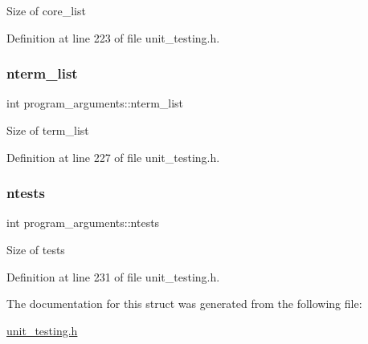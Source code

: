 Size of {\ttfamily core\+\_\+list} 

Definition at line 223 of file unit\+\_\+testing.\+h.

\mbox{\label{structprogram__arguments_a48fbd16e4ce7ab5438078817c4931108}} 
\subsubsection{\texorpdfstring{nterm\+\_\+list}{nterm\_list}}
{\footnotesize\ttfamily int program\+\_\+arguments\+::nterm\+\_\+list}

Size of {\ttfamily term\+\_\+list} 

Definition at line 227 of file unit\+\_\+testing.\+h.

\mbox{\label{structprogram__arguments_a8b96bf14afced6bae0d45424ab2fac57}} 
\subsubsection{\texorpdfstring{ntests}{ntests}}
{\footnotesize\ttfamily int program\+\_\+arguments\+::ntests}

Size of {\ttfamily tests} 

Definition at line 231 of file unit\+\_\+testing.\+h.



The documentation for this struct was generated from the following file\+:\begin{DoxyCompactItemize}
\item 
\hyperlink{unit__testing_8h}{unit\+\_\+testing.\+h}\end{DoxyCompactItemize}
